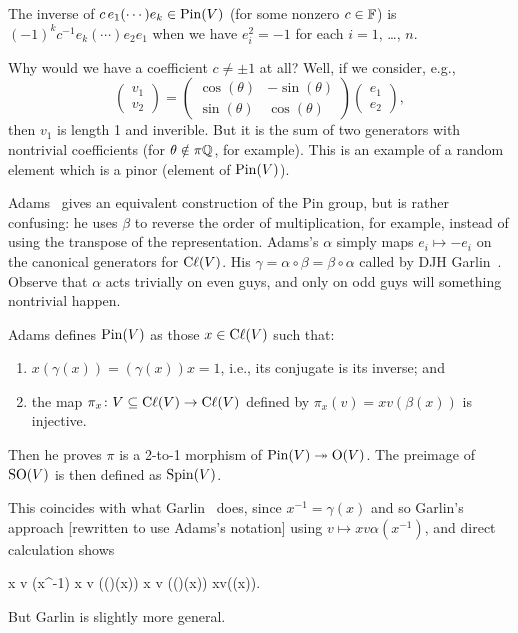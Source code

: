 \M
The inverse of $c\, e_{1}(\cdots)e_{k}\in\operatorname{Pin}(V)$ (for some nonzero $c\in\mathbb{F}$)
is $(-1)^{k}c^{-1}e_{k}(\cdots)e_{2}e_{1}$ when we have $e_{i}^{2}=-1$
for each $i=1$, \dots, $n$.

Why would we have a coefficient $c\neq\pm1$ at all? Well, if we
consider, e.g.,
\begin{equation}
\begin{pmatrix}
v_{1}\\ v_{2}
\end{pmatrix} = \begin{pmatrix}\cos(\theta) & -\sin(\theta)\\
\sin(\theta) & \cos(\theta)
\end{pmatrix}
\begin{pmatrix}
e_{1}\\ e_{2}
\end{pmatrix},
\end{equation}
then $v_{1}$ is length 1 and inverible. But it is the sum of two
generators with nontrivial coefficients (for $\theta\notin\pi\mathbb{Q}$, for
example). This is an example of a random element which is a pinor
(element of $\operatorname{Pin}(V)$).

\begin{remark}
Adams~\cite{adams1996:ex} gives an equivalent construction of the Pin
group, but is rather confusing: he uses $\beta$ to reverse the order of
multiplication, for example, instead of using the transpose of the
representation. Adams's $\alpha$ simply maps $e_{i}\mapsto-e_{i}$ on the
canonical generators for $\mathrm{C}\ell(V)$. His
$\gamma=\alpha\circ\beta=\beta\circ\alpha$ called 
by DJH Garlin~\cite[pg.94]{Garling:2011zz}. Observe that $\alpha$ acts
trivially on even guys, and only on odd guys will something nontrivial
happen. 
\end{remark}

\begin{remark}
Adams defines $\operatorname{Pin}(V)$ as those $x\in\mathrm{C}\ell(V)$ such that:
\begin{enumerate}
\item $x(\gamma(x))=(\gamma(x))x=1$, i.e., its conjugate is its inverse; and
\item the map $\pi_{x}\colon V\subseteq\mathrm{C}\ell(V)\to\mathrm{C}\ell(V)$ defined by $\pi_{x}(v)=xv(\beta(x))$
is injective.
\end{enumerate}
Then he proves $\pi$ is a 2-to-1 morphism of $\operatorname{Pin}(V)\twoheadrightarrow\mathrm{O}(V)$. The
preimage of $\operatorname{SO}(V)$ is then defined as $\operatorname{Spin}(V)$.

This coincides with what Garlin~\cite[ch.8]{Garling:2011zz} does, since
$x^{-1}=\gamma(x)$ and so Garlin's approach [rewritten to use Adams's
  notation] using $v\mapsto x v \alpha(x^{-1})$, and direct calculation
shows
\begin{calculation}
  x v \alpha(x^{-1})
  x v ((\alpha\circ\gamma)(x))
x v ((\alpha\circ\alpha\circ\beta)(x))
xv(\beta(x)).
\end{calculation}
But Garlin is slightly more general.
\end{remark}


